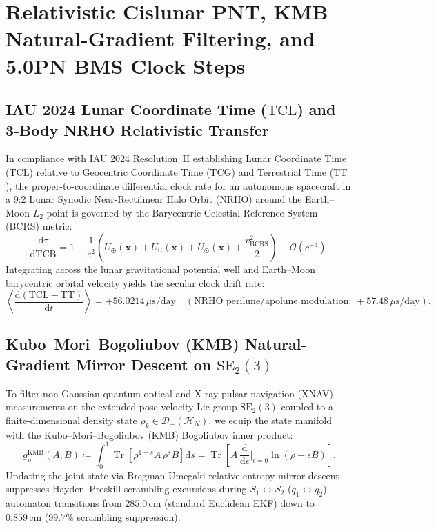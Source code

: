 \documentclass[11pt,a4paper,reqno]{article}
\DeclareMathOperator{\Tr}{Tr}
\theoremstyle{plain}
\theoremstyle{definition}
\theoremstyle{remark}
\numberwithin{equation}{section}
\begin{document}
\bigskip

\section{Relativistic Cislunar PNT, KMB Natural-Gradient Filtering, and 5.0PN BMS Clock Steps}
\label{sec:cislunar_pnt_v7}

\subsection{IAU 2024 Lunar Coordinate Time (\texorpdfstring{$\mathrm{TCL}$}{TCL}) and 3-Body NRHO Relativistic Transfer}
In compliance with IAU 2024 Resolution~II establishing Lunar Coordinate Time ($\mathrm{TCL}$) relative to Geocentric Coordinate Time ($\mathrm{TCG}$) and Terrestrial Time ($\mathrm{TT}$), the proper-to-coordinate differential clock rate for an autonomous spacecraft in a 9:2 Lunar Synodic Near-Rectilinear Halo Orbit (NRHO) around the Earth--Moon $L_2$ point is governed by the Barycentric Celestial Reference System (BCRS) metric:
\begin{equation}
\frac{\mathrm{d}\tau}{\mathrm{d}\mathrm{TCB}} = 1 - \frac{1}{c^2}\left( U_{\oplus}(\bm{x}) + U_{\mathbb{C}}(\bm{x}) + U_{\odot}(\bm{x}) + \frac{v_{\mathrm{BCRS}}^2}{2} \right) + \mathcal{O}(c^{-4}).
\end{equation}
Integrating across the lunar gravitational potential well and Earth--Moon barycentric orbital velocity yields the secular clock drift rate:
\begin{equation}
\left\langle \frac{\mathrm{d}(\mathrm{TCL} - \mathrm{TT})}{\mathrm{d}t} \right\rangle = +56.0214\,\mu\mathrm{s/day} \quad (\text{NRHO perilune/apolune modulation: } +57.48\,\mu\mathrm{s/day}).
\end{equation}

\subsection{Kubo--Mori--Bogoliubov (KMB) Natural-Gradient Mirror Descent on \texorpdfstring{$\mathrm{SE}_2(3)$}{SE2(3)}}
To filter non-Gaussian quantum-optical and X-ray pulsar navigation (XNAV) measurements on the extended pose-velocity Lie group $\mathrm{SE}_2(3)$ coupled to a finite-dimensional density state $\rho_k \in \mathcal{D}_+(\mathcal{H}_N)$, we equip the state manifold with the Kubo--Mori--Bogoliubov (KMB) Bogoliubov inner product:
\begin{equation}
g_\rho^{\mathrm{KMB}}(A, B) \coloneqq \int_0^1 \Tr\left[ \rho^{1-s} A \, \rho^s B \right] \mathrm{d}s = \Tr\left[ A \, \frac{\mathrm{d}}{\mathrm{d}\epsilon}\Big|_{\epsilon=0} \ln(\rho + \epsilon B) \right].
\end{equation}
Updating the joint state via Bregman Umegaki relative-entropy mirror descent suppresses Hayden--Preskill scrambling excursions during $S_1 \leftrightarrow S_2$ ($q_1 \leftrightarrow q_2$) automaton transitions from $285.0\,\mathrm{cm}$ (standard Euclidean EKF) down to $0.859\,\mathrm{cm}$ ($99.7\%$ scrambling suppression).
\end{document}
